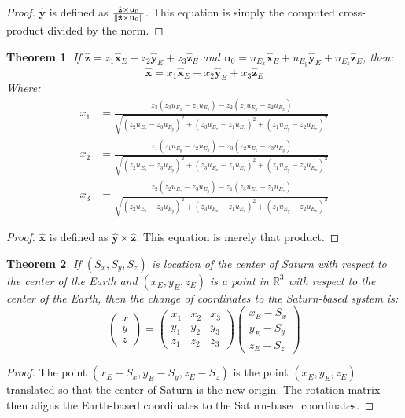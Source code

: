 \documentclass[oneside]{book}
\theoremstyle{mystyle}
\newtheorem{theorem}{Theorem}[section]
\DeclarePairedDelimiter\norm{\lVert}{\rVert}
\begin{document}
\begin{proof}
$\hat{\mathbf{y}}$ is defined as $\frac{\hat{\mathbf{z}}\times \mathbf{u}_{0}}{\norm{\hat{\mathbf{z}}\times \mathbf{u}_{0}}}$. This equation is simply the computed cross-product divided by the norm.
\end{proof}
\begin{theorem}
If $\hat{\mathbf{z}} = z_1\hat{\mathbf{x}}_{E}+z_2\hat{\mathbf{y}}_{E}+z_3\hat{\mathbf{z}}_{E}$ and $\mathbf{u}_{0} = u_{E_{x}}\hat{\mathbf{x}}_{E}+u_{E_{y}}\hat{\mathbf{y}}_{E}+u_{E_{z}}\hat{\mathbf{z}}_{E}$, then:
\begin{equation*}
\hat{\mathbf{x}} = x_1 \hat{\mathbf{x}}_{E}+x_2\hat{\mathbf{y}}_{E}+x_3\hat{\mathbf{z}}_{E}
\end{equation*}
Where:
\begin{align*}
x_1 &= \frac{z_3(z_{3}u_{E_{x}}-z_1u_{E_{z}})-z_2(z_1u_{E_{y}}-z_2u_{E_{x}})}{\sqrt{(z_2u_{E_{z}}-z_3u_{E_{y}})^2+(z_3u_{E_{x}}-z_1u_{E_{z}})^2+(z_1u_{E_{y}}-z_2u_{E_{x}})^2}}\\
x_2 &= \frac{z_1(z_{1}u_{E_{y}}-z_{2}u_{E_{x}})-z_{3}(z_{2}u_{E_{z}}-z_{3}u_{E_{y}})}{\sqrt{(z_2u_{E_{z}}-z_3u_{E_{y}})^2+(z_3u_{E_{x}}-z_1u_{E_{z}})^2+(z_1u_{E_{y}}-z_2u_{E_{x}})^2}}\\
x_3 &= \frac{z_2(z_2u_{E_{z}}-z_3u_{E_{y}})-z_1(z_{3}u_{E_{x}}-z_{1}u_{E_{z}})}{\sqrt{(z_2u_{E_{z}}-z_3u_{E_{y}})^2+(z_3u_{E_{x}}-z_1u_{E_{z}})^2+(z_1u_{E_{y}}-z_2u_{E_{x}})^2}}
\end{align*}
\end{theorem}
\begin{proof}
$\hat{\mathbf{x}}$ is defined as $\hat{\mathbf{y}}\times \hat{\mathbf{z}}$. This equation is merely that product.
\end{proof}
\begin{theorem}
If $(S_x,S_y,S_z)$ is location of the center of Saturn with respect to the center of the Earth and $(x_{E},y_{E},z_{E})$ is a point in $\mathbb{R}^3$ with respect to the center of the Earth, then the change of coordinates to the Saturn-based system is:
\begin{equation*}
\begin{pmatrix} x\\y\\z \end{pmatrix} = \begin{pmatrix} x_1 & x_2 & x_3 \\ y_1 & y_2 & y_3 \\ z_1 & z_2 & z_3 \end{pmatrix} \begin{pmatrix} x_{E}-S_{x} \\ y_{E}-S_{y} \\ z_{E} - S_{z}\end{pmatrix}
\end{equation*}
\end{theorem}
\begin{proof}
The point $(x_{E}-S_{x}, y_{E}-S_{y}, z_{E}-S_{z})$ is the point $(x_{E},y_{E},z_{E})$ translated so that the center of Saturn is the new origin. The rotation matrix then aligns the Earth-based coordinates to the Saturn-based coordinates.
\end{proof}
\end{document}
